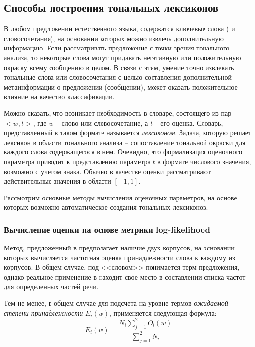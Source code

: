 \subsection{Способы построения тональных лексиконов}
    В любом предложении естественного языка, содержатся ключевые слова ( и словосочетания),
    на основании которых можно извлечь дополнительную информацию. Если рассматривать
    предложение с точки зрения тонального анализа, то некоторые слова могут
    придавать негативную или положительную окраску всему сообщению в целом.
    В связи с этим, умение точно извлекать тональные слова или словосочетания
    с целью составления дополнительной метаинформации о предложении (сообщении),
    может оказать положительное влияние на качество классификации.

    Можно сказать, что возникает необходимость в словаре, состоящего из пар
    $<w, t>$, где $w$ -- слово или словосочетание, а $t$ -- его оценка.
    Словарь, представленный в таком формате называется {\it лексиконом}.
    Задача, которую решает лексикон в области тонального анализа -- сопоставление
    тональной окраски для каждого слова содержащегося в нем.
    Очевидно, что формализация оценочного параметра приводит к представлению
    параметра $t$ в формате числового значения, возможно с учетом знака.
    Обычно в качестве оценки рассматривают действительные значения в области
    $\left[ -1, 1\right]$.

    Рассмотрим основные методы вычисления оценочных параметров, на основе которых
    возможно автоматическое создания тональных лексиконов.

        \subsubsection{Вычисление оценки на основе метрики log-likelihood}
        Метод, предложенный в \cite{lexiconLL} предполагает наличие двух корпусов, на основании
        которых вычисляется частотная оценка принадлежности слова к каждому из корпусов.
        В общем случае, под <<словом>> понимается терм предложения, однако
        реальное применение в \cite{lexiconLL} находит свое место в составлении
        списка частот для определенных частей речи.

        Тем не менее, в общем случае для подсчета на уровне термов {\it ожидаемой
        степени принадлежности} $E_i(w)$, применяется следующая формула:
        \begin{equation}
            \label{eq:classDifference}
            E_i(w) = \dfrac{N_i\sum\limits_{j=1}^{2}O_i(w)}{\sum\limits_{j=1}^{2}N_i}
        \end{equation}

